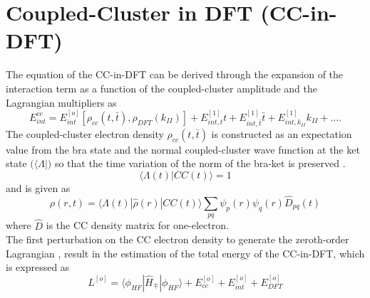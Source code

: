 \documentclass[a4paper,11pt]{report}
\begin{document}
\section{Coupled-Cluster in DFT (CC-in-DFT)}
The equation of the CC-in-DFT can be derived through the expansion of the interaction term as a function of the 
coupled-cluster amplitude and the Lagrangian multipliers as
\begin{equation}\label{aede2}
E_{int}^{cc} = E_{int}^{[o]}[\rho_{cc}(t,\bar{t}),\rho_{DFT}(k_{II})] + E_{int,t}^{[1]}t + E_{int,\bar{t}}^{[1]}\bar{t} + 
E_{int,k_{II}}^{[1]}k_{II} + ....
\end{equation}
The coupled-cluster electron density $\rho_{cc}(t,\bar{t})$ is constructed as an expectation value from the bra state 
and the normal coupled-cluster wave function at the ket state $\big(\big \langle \Lambda|\big)$ 
so that the time variation of the 
norm of the bra-ket is preserved \citep{koch1990coupled,hofener2012molecular}.
\begin{equation}\label{aede2}
\big \langle \Lambda(t)|CC(t)\big \rangle  = 1
\end{equation}
and is given as 
\begin{equation}\label{aede2}
\rho(r,t) = \big \langle \Lambda(t)|\hat{\rho}(r)|CC(t)\big \rangle  \sum_{pq}\psi_{p}(r)\psi_{q}(r)\hat{D}_{pq}(t)
\end{equation}
where $\hat{D}$ is the CC density matrix for one-electron.\\
The first perturbation on the CC electron density to generate the zeroth-order Lagrangian \citep{kongsted2003coupled},  
result in the estimation of the total energy of the CC-in-DFT, which is expressed as
\begin{equation}\label{aede2}
L^{[o]} =\big \langle \phi_{HF}|\hat{H}_{\mp}|\phi_{HF}\big \rangle  + E_{cc}^{[o]} + E_{int}^{[o]} + E_{DFT}^{[o]}
\end{equation}








\end{document}
